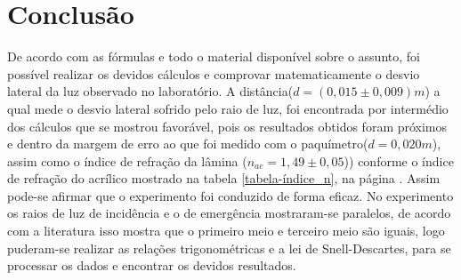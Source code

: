 \documentclass[
	12pt,				%
	oneside,			%
	a4paper,			%
	english,			%
	french,				%
	spanish,			%
	brazil				%
	]{abntex2}
\begin{document}
\newpage



\chapter{Conclusão}
De acordo com as fórmulas e todo o material disponível sobre o assunto, foi possível realizar os devidos cálculos e comprovar matematicamente o desvio lateral da luz observado no laboratório. A distância($d = (0,015 \pm 0,009)m$) a qual mede o desvio lateral sofrido pelo raio de luz, foi encontrada por intermédio dos cálculos que se mostrou favorável, pois os resultados obtidos foram próximos e dentro da margem de erro ao que foi medido com o paquímetro($d = 0,020m$), assim como o índice de refração da lâmina ($n_{ac} = 1,49 \pm 0,05$)) conforme o índice de refração do acrílico mostrado na tabela \ref{tabela-índice_n}, na página \pageref{tabela-índice_n}. Assim pode-se afirmar que o experimento foi conduzido de forma eficaz. No experimento os raios de luz de incidência e o de emergência mostraram-se paralelos, de acordo com a literatura isso mostra que o primeiro meio e terceiro meio são iguais, logo puderam-se realizar as relações trigonométricas e a lei de Snell-Descartes, para se processar os dados e encontrar os devidos resultados.

\postextual

%

\end{document}
